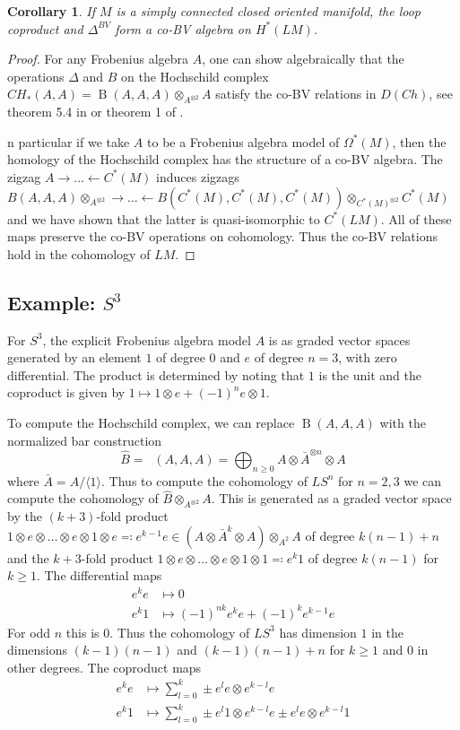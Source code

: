 \documentclass{scrartcl}
\theoremstyle{plain}
\newtheorem{corollary}[theorem]{Corollary}
\theoremstyle{definition}
\newcommand{\eqdef}{\eqqcolon}
\newcommand{\from}{\leftarrow}
\DeclareMathOperator{\BC}{B}
\DeclareMathOperator{\nBC}{\hat B}
\begin{document}
\begin{corollary}
    If $M$ is a simply connected closed oriented manifold, the loop coproduct and $\Delta^{BV}$ form a co-BV algebra on $H^*(LM)$.
\end{corollary}
\begin{proof}
    For any Frobenius algebra $A$, one can show algebraically that the operations $\Delta$ and $B$ on the Hochschild complex $CH_*(A, A) = \BC(A, A, A)\otimes_{A^{\otimes 2}} A$ satisfy the co-BV relations in $D(Ch)$, see theorem 5.4 in \cite{abbaspour2015algebraic} or theorem 1 of \cite{tradler2008bvalg}.

    n particular if we take $A$ to be a Frobenius algebra model of $\Omega^*(M)$, then the homology of the Hochschild complex has the structure of a co-BV algebra. The zigzag $A\to\dots\from C^*(M)$ induces zigzags $B(A, A, A)\otimes_{A^{\otimes 2}} \to\dots\from B(C^*(M),C^*(M), C^*(M))\otimes_{C^*(M)^{\otimes 2}} C^*(M)$ and we have shown that the latter is quasi-isomorphic to $C^*(LM)$. All of these maps preserve the co-BV operations on cohomology. Thus the co-BV relations hold in the cohomology of $LM$. 
\end{proof}


\subsection[Example: The three-dimensional Sphere]{Example: $S^3$}

For $S^3$, the explicit Frobenius algebra model $A$ is as graded vector spaces generated by an element $1$ of degree $0$ and $e$ of degree $n=3$, with zero differential. The product is determined by noting that $1$ is the unit and the coproduct is given by $1\mapsto 1\otimes e + (-1)^n e\otimes 1$. 

To compute the Hochschild complex, we can replace $\BC(A, A, A)$ with the normalized bar construction $$\hat B = \nBC(A, A, A) = \bigoplus_{n\geq 0} A\otimes \bar A^{\otimes n} \otimes A$$
where $\bar A = A/\langle 1\rangle$. Thus to compute the cohomology of $LS^n$ for $n=2,3$ we can compute the cohomology of $\hat B\otimes_{A^{\otimes 2}} A$. This is generated as a graded vector space by the $(k+3)$-fold product $1 \otimes e\otimes\dots\otimes e\otimes 1 \otimes e \eqdef e^{k-1} e\in (A\otimes \bar A^{k}\otimes A)\otimes_{A^2} A$ of degree $k(n-1)+n$ and the $k+3$-fold product $1\otimes e\otimes\dots\otimes e\otimes 1 \otimes 1 \eqdef e^{k} 1$ of degree $k(n-1)$ for $k\geq 1$. The differential maps 
\begin{align*}
    e^k e &\mapsto 0 \\
    e^k 1 &\mapsto (-1)^{nk} e^{k} e + (-1)^{k} e^{k-1} e
\end{align*}
For odd $n$ this is $0$. Thus the cohomology of $LS^3$ has dimension $1$ in the dimensions $(k-1)(n-1)$ and $(k-1)(n-1)+n$ for $k\geq 1$ and $0$ in other degrees. The coproduct maps 
\begin{align*}
    e^{k} e &\mapsto \sum_{l=0}^k \pm e^{l} e \otimes e^{k-l} e \\
    e^{k} 1 &\mapsto \sum_{l=0}^k \pm e^{l} 1 \otimes e^{k-l} e \pm e^{l} e \otimes e^{k-l} 1
\end{align*}
\end{document}
